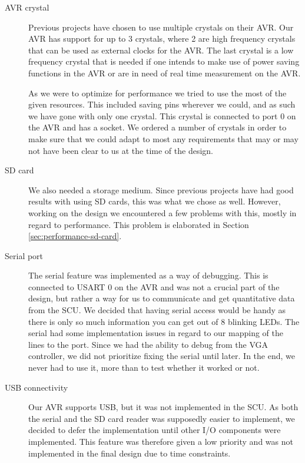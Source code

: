 \begin{description}

\item[AVR crystal] \hfill

Previous projects have chosen to use multiple crystals on their AVR. Our AVR has support for up to 3 crystals, where 2 are high frequency crystals that can be used as external clocks for the AVR. The last crystal is a low frequency crystal that is needed if one intends to make use of power saving functions in the AVR or are in need of real time measurement on the AVR.

As we were to optimize for performance we tried to use the most of the given resources. This included saving pins wherever we could, and as such we have gone with only one crystal. This crystal is connected to port 0 on the AVR and has a socket. We ordered a number of crystals in order to make sure that we could adapt to most any requirements that may or may not have been clear to us at the time of the design.

\item[SD card]  \hfill %

We also needed a storage medium. Since previous projects have had good results with
using \ac{SD} cards, this was what we chose as well. However, working on the
design we encountered a few problems with this, mostly in
regard to performance. This problem is elaborated in Section
\ref{sec:performance-sd-card}.

\item[Serial port]  \hfill

The serial feature was implemented as a way of debugging. This is connected to
\ac{USART} 0 on the AVR and was not a crucial part of the design, but rather a
way for us to communicate and get quantitative data from the \ac{SCU}. We
decided that having serial access would be handy as there is only so much
information you can get out of 8 blinking \acp{LED}. The serial had some
implementation issues in regard to our mapping of the lines to the port. Since
we had the ability to debug from the \ac{VGA} controller, we did not prioritize
fixing the serial until later. In the end, we never had to use it, more than to
test whether it worked or not.

\item[USB connectivity]  \hfill 

Our AVR supports \ac{USB}, but it was not implemented in the \ac{SCU}. As both
the serial and the \ac{SD} card reader was supposedly easier to
implement\cite{berg2011festinalente}, we decided to defer the implementation
until other \ac{I/O} components were implemented. This feature was therefore
given a low priority and was not implemented in the final design due to time
constraints.
 

\end{description}
